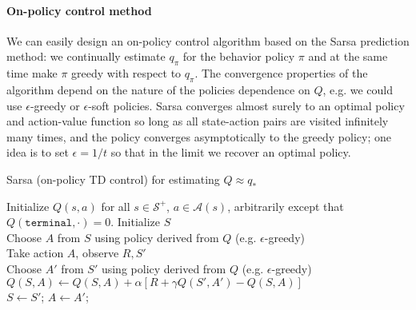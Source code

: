 \documentclass[12pt]{article}
\begin{document}
\paragraph{On-policy control method}
We can easily design an on-policy control algorithm based on the Sarsa prediction method: we continually estimate $q_\pi$ for the behavior policy $\pi$ and at the same time make $\pi$ greedy with respect to $q_\pi$. The convergence properties of the algorithm depend on the nature of the policies dependence on $Q$, e.g. we could use $\epsilon$-greedy or $\epsilon$-soft policies. Sarsa converges almost surely to an optimal policy and action-value function so long as all state-action pairs are visited infinitely many times, and the policy converges asymptotically to the greedy policy; one idea is to set $\epsilon = 1/t$ so that in the limit we recover an optimal policy.

\begin{algorithm}[h]
  \caption{Sarsa (on-policy TD control) for estimating $Q \approx q_*$}
  Initialize $Q(s,a)$ for all $s \in \mathcal S^+$, $a \in \mathcal A(s)$,   arbitrarily except that $Q(\texttt{terminal}, \cdot) = 0$.
 {
  Initialize $S$ \\
  Choose $A$ from $S$ using policy derived from $Q$ (e.g. $\epsilon$-greedy) \\
   {
    Take action $A$, observe $R, S'$ \\
    Choose $A'$ from $S'$ using policy derived from $Q$ (e.g. $\epsilon$-greedy)         \\
    $Q(S, A) \gets Q(S, A) + \alpha \left[R + \gamma Q(S', A') - Q(S, A)\right]$     \\
    $S \gets S'$; $A \gets A'$;
  }
}
\end{algorithm}
\end{document}
